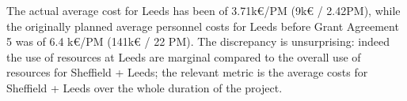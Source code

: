 The actual average cost for Leeds has been of 3.71k€/PM (9k€ /
2.42PM), while the originally planned average personnel costs for
Leeds before Grant Agreement 5 was of 6.4 k€/PM (141k€ / 22 PM). The
discrepancy is unsurprising: indeed the use of resources at Leeds are
marginal compared to the overall use of resources for Sheffield +
Leeds; the relevant metric is the average costs for Sheffield + Leeds
over the whole duration of the project.


